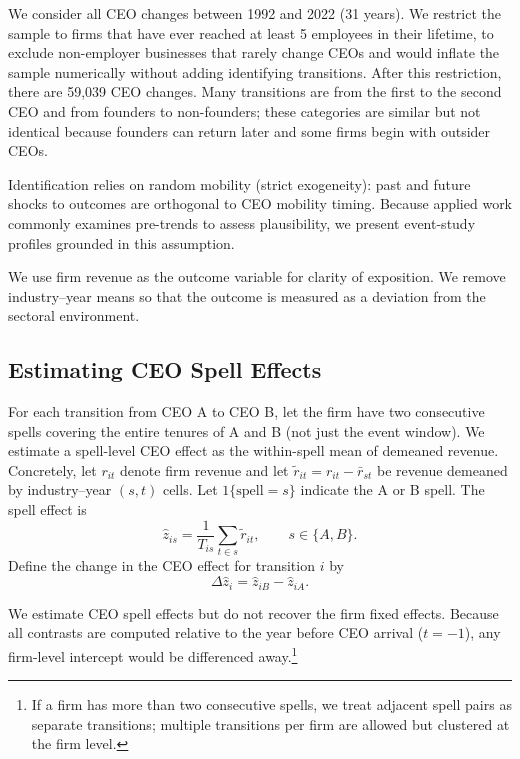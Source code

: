 \documentclass[11pt,a4paper]{article}
\begin{document}
We consider all CEO changes between 1992 and 2022 (31 years). We restrict the sample to firms that have ever reached at least 5 employees in their lifetime, to exclude non-employer businesses that rarely change CEOs and would inflate the sample numerically without adding identifying transitions. After this restriction, there are 59,039 CEO changes. Many transitions are from the first to the second CEO and from founders to non-founders; these categories are similar but not identical because founders can return later and some firms begin with outsider CEOs.

Identification relies on random mobility (strict exogeneity): past and future shocks to outcomes are orthogonal to CEO mobility timing. Because applied work commonly examines pre-trends to assess plausibility, we present event-study profiles grounded in this assumption.

We use firm revenue as the outcome variable for clarity of exposition. We remove industry–year means so that the outcome is measured as a deviation from the sectoral environment.

\subsection*{Estimating CEO Spell Effects}
For each transition from CEO A to CEO B, let the firm have two consecutive spells covering the entire tenures of A and B (not just the event window). We estimate a spell-level CEO effect as the within-spell mean of demeaned revenue. Concretely, let \(r_{it}\) denote firm revenue and let \(\tilde r_{it}=r_{it}-\bar r_{st}\) be revenue demeaned by industry–year \((s,t)\) cells. Let \(1\{\text{spell}=s\}\) indicate the A or B spell. The spell effect is
\begin{equation}
\hat z_{is} = \frac{1}{T_{is}}\sum_{t\in s} \tilde r_{it},\qquad s\in\{A,B\}.
\end{equation}
Define the change in the CEO effect for transition \(i\) by
\begin{equation}
\Delta \hat z_i = \hat z_{iB} - \hat z_{iA}.
\end{equation}

We estimate CEO spell effects but do not recover the firm fixed effects. Because all contrasts are computed relative to the year before CEO arrival ($t=-1$), any firm-level intercept would be differenced away.\footnote{If a firm has more than two consecutive spells, we treat adjacent spell pairs as separate transitions; multiple transitions per firm are allowed but clustered at the firm level.}
\end{document}
